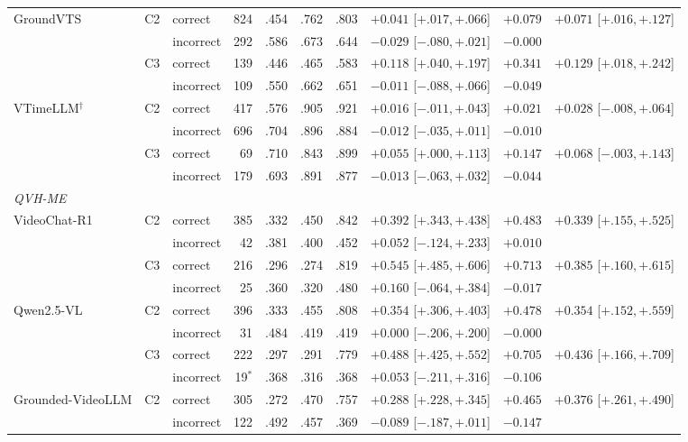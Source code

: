 \begin{table}[t]
\begin{tabular}{lllrrrrlrl}
\addlinespace
GroundVTS & C2 & correct & 824 & .454 & .762 & .803 & $+0.041$ [$+.017,+.066$] & $+0.079$ & $+0.071$ [$+.016,+.127$] \\
 &  & incorrect & 292 & .586 & .673 & .644 & $-0.029$ [$-.080,+.021$] & $-0.000$ &  \\
 & C3 & correct & 139 & .446 & .465 & .583 & $+0.118$ [$+.040,+.197$] & $+0.341$ & $+0.129$ [$+.018,+.242$] \\
 &  & incorrect & 109 & .550 & .662 & .651 & $-0.011$ [$-.088,+.066$] & $-0.049$ &  \\
\addlinespace
VTimeLLM$^{\dagger}$ & C2 & correct & 417 & .576 & .905 & .921 & $+0.016$ [$-.011,+.043$] & $+0.021$ & $+0.028$ [$-.008,+.064$] \\
 &  & incorrect & 696 & .704 & .896 & .884 & $-0.012$ [$-.035,+.011$] & $-0.010$ &  \\
 & C3 & correct & 69 & .710 & .843 & .899 & $+0.055$ [$+.000,+.113$] & $+0.147$ & $+0.068$ [$-.003,+.143$] \\
 &  & incorrect & 179 & .693 & .891 & .877 & $-0.013$ [$-.063,+.032$] & $-0.044$ &  \\
\midrule
\multicolumn{10}{l}{\textit{QVH-ME}} \\
VideoChat-R1 & C2 & correct & 385 & .332 & .450 & .842 & $+0.392$ [$+.343,+.438$] & $+0.483$ & $+0.339$ [$+.155,+.525$] \\
 &  & incorrect & 42 & .381 & .400 & .452 & $+0.052$ [$-.124,+.233$] & $+0.010$ &  \\
 & C3 & correct & 216 & .296 & .274 & .819 & $+0.545$ [$+.485,+.606$] & $+0.713$ & $+0.385$ [$+.160,+.615$] \\
 &  & incorrect & 25 & .360 & .320 & .480 & $+0.160$ [$-.064,+.384$] & $-0.017$ &  \\
\addlinespace
Qwen2.5-VL & C2 & correct & 396 & .333 & .455 & .808 & $+0.354$ [$+.306,+.403$] & $+0.478$ & $+0.354$ [$+.152,+.559$] \\
 &  & incorrect & 31 & .484 & .419 & .419 & $+0.000$ [$-.206,+.200$] & $-0.000$ &  \\
 & C3 & correct & 222 & .297 & .291 & .779 & $+0.488$ [$+.425,+.552$] & $+0.705$ & $+0.436$ [$+.166,+.709$] \\
 &  & incorrect & 19$^{\ast}$ & .368 & .316 & .368 & $+0.053$ [$-.211,+.316$] & $-0.106$ &  \\
\addlinespace
Grounded-VideoLLM & C2 & correct & 305 & .272 & .470 & .757 & $+0.288$ [$+.228,+.345$] & $+0.465$ & $+0.376$ [$+.261,+.490$] \\
 &  & incorrect & 122 & .492 & .457 & .369 & $-0.089$ [$-.187,+.011$] & $-0.147$ &  \\

\end{tabular}
\end{table}
